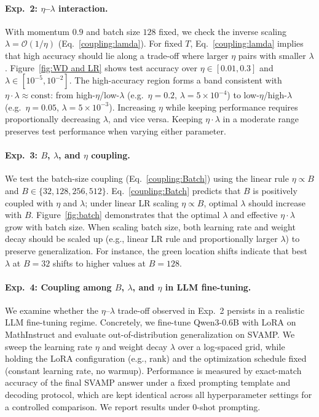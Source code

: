 \paragraph{Exp.\ 2: $\eta$--$\lambda$ interaction.}
With momentum $0.9$ and batch size $128$ fixed, we check the inverse scaling $\lambda =\mathcal{O}( 1/\eta)$ (Eq.~\ref{coupling:lamda}). 
For fixed $T$, Eq.~\eqref{coupling:lamda} implies that high accuracy should lie along a trade-off where larger $\eta$ pairs with smaller $\lambda$. 
Figure~\ref{fig:WD and LR} shows test accuracy over $\eta \in [0.01, 0.3]$ and $\lambda \in [10^{-5}, 10^{-2}]$. 
The high-accuracy region forms a band consistent with $\eta \cdot \lambda \approx \text{const}$: from high-$\eta$/low-$\lambda$ (e.g.\ $\eta{=}0.2$, $\lambda{=}5{\times}10^{-4}$) to low-$\eta$/high-$\lambda$ (e.g.\ $\eta{=}0.05$, $\lambda{=}5{\times}10^{-3}$). 
Increasing $\eta$ while keeping performance requires proportionally decreasing $\lambda$, and vice versa. 
Keeping $\eta \cdot \lambda$ in a moderate range preserves test performance when varying either parameter.

\paragraph{Exp.\ 3: $B$, $\lambda$, and $\eta$ coupling.}
We test the batch-size coupling (Eq.~\ref{coupling:Batch}) using the linear rule $\eta \propto B$ and $B \in \{32, 128, 256, 512\}$. 
Eq.~\eqref{coupling:Batch} predicts that $B$ is positively coupled with $\eta$ and $\lambda$; under linear LR scaling $\eta \propto B$, optimal $\lambda$ should increase with $B$. 
Figure~\ref{fig:batch} demonstrates that the optimal $\lambda$ and effective $\eta \cdot \lambda$ grow with batch size. When scaling batch size, both learning rate and weight decay should be scaled up (e.g., linear LR rule and proportionally larger $\lambda$) to preserve generalization.
For instance, the green location shifts indicate that best $\lambda$ at $B{=}32$ shifts to higher values at $B{=}128$.

\paragraph{Exp.\ 4: Coupling among $B$, $\lambda$, and $\eta$ in LLM fine-tuning.}
We examine whether the $\eta$–$\lambda$ trade-off observed in Exp.~2 persists in a realistic LLM fine-tuning regime. Concretely, we fine-tune Qwen3-0.6B with LoRA on MathInstruct and evaluate out-of-distribution generalization on SVAMP. We sweep the learning rate $\eta$ and weight decay $\lambda$ over a log-spaced grid, while holding the LoRA configuration (e.g., rank) and the optimization schedule fixed (constant learning rate, no warmup). Performance is measured by exact-match accuracy of the final SVAMP answer under a fixed prompting template and decoding protocol, which are kept identical across all hyperparameter settings for a controlled comparison. We report results under 0-shot prompting.

